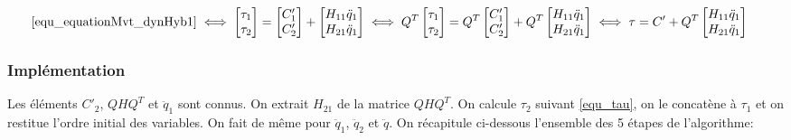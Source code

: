 \documentclass{report}
\begin{document}
\begin{align}
\eqref{equ_equationMvt_dynHyb1}
&\iff
\begin{bmatrix}
\tau_1 \\ 
\tau_2
\end{bmatrix} 
=
\begin{bmatrix}
C'_1 \\ 
C'_2
\end{bmatrix} 
+
\begin{bmatrix}
H_{11} \ddot{q}_1 \\ 
H_{21} \ddot{q}_1
\end{bmatrix} \iff
Q^T
\begin{bmatrix}
\tau_1 \\ 
\tau_2
\end{bmatrix} 
=
Q^T
\begin{bmatrix}
C'_1 \\ 
C'_2
\end{bmatrix} 
+
Q^T
\begin{bmatrix}
H_{11} \ddot{q}_1 \\ 
H_{21} \ddot{q}_1
\end{bmatrix} \iff \tau = C'
+
Q^T
\begin{bmatrix}
H_{11} \ddot{q}_1 \\ 
H_{21} \ddot{q}_1
\end{bmatrix}
\end{align}


\subsubsection{Implémentation}

Les éléments $C'_2$, $QHQ^T$ et $\ddot{q}_1$ sont connus. On extrait $H_{21}$ de la matrice $QHQ^T$. On calcule $\tau_2$ suivant \eqref{equ_tau}, on le concatène à $\tau_1$ et on restitue l'ordre initial des variables. On fait de même pour $\ddot{q}_1$, $\ddot{q}_2$ et $\ddot{q}$.
On récapitule ci-dessous l'ensemble des 5 étapes de l'algorithme: \\
\end{document}
